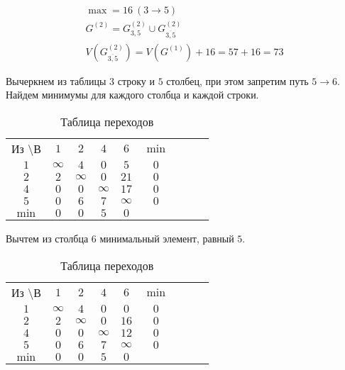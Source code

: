 \begin{gather*}
\max = 16\ (3 \rightarrow 5) \\
G^{(2)} = G_{3,5}^{(2)} \cup G_{\overline{3,5}}^{(2)} \\
V(G_{\overline{3,5}}^{(2)}) = V(G^{(1)}) + 16 = 57 + 16 = 73
\end{gather*}

Вычеркнем из таблицы $3$ строку и $5$ столбец, при этом запретим путь $5 \rightarrow 6$. Найдем минимумы для каждого столбца и каждой строки.

\begin{table}[H]
\begin{center}
	\def\tabcolsep{15pt}
	\caption{Таблица переходов}
	\label{tab:12}
	\begin{tabular}{|c||c|c|c|c|c|c|c|c|}
		\hline
		Из \textbackslash В & $1$ & $2$ & $4$ & $6$ & $\min$ \\
		\hhline{|=#=|=|=|=|=|=|}
		$1$ & $\infty$ & $4$ & $0$ & $5$ & $0$ \\
		\hline
		$2$ & $2$ & $\infty$ & $0$ & $21$ & $0$ \\
		\hline
		$4$ & $0$ & $0$ & $\infty$ & $17$ & $0$ \\
		\hline
		$5$ & $0$ & $6$ & $7$ & $\infty$ & $0$ \\
		\hhline{|=#=|=|=|=|=|=|} 
		$\min$ & $0$ & $0$ & $5$ & $0$ & \\ 
		\hline
	\end{tabular}
\end{center}
\end{table}

Вычтем из столбца $6$ минимальный элемент, равный $5$.

\begin{table}[H]
\begin{center}
	\def\tabcolsep{15pt}
	\caption{Таблица переходов}
	\label{tab:13}
	\begin{tabular}{|c||c|c|c|c|c|c|c|c|}
		\hline
		Из \textbackslash В & $1$ & $2$ & $4$ & $6$ & $\min$ \\
		\hhline{|=#=|=|=|=|=|=|}
		$1$ & $\infty$ & $4$ & $0$ & $0$ & $0$ \\
		\hline
		$2$ & $2$ & $\infty$ & $0$ & $16$ & $0$ \\
		\hline
		$4$ & $0$ & $0$ & $\infty$ & $12$ & $0$ \\
		\hline
		$5$ & $0$ & $6$ & $7$ & $\infty$ & $0$ \\
		\hhline{|=#=|=|=|=|=|=|} 
		$\min$ & $0$ & $0$ & $5$ & $0$ & \\ 
		\hline
	\end{tabular}
\end{center}
\end{table}

